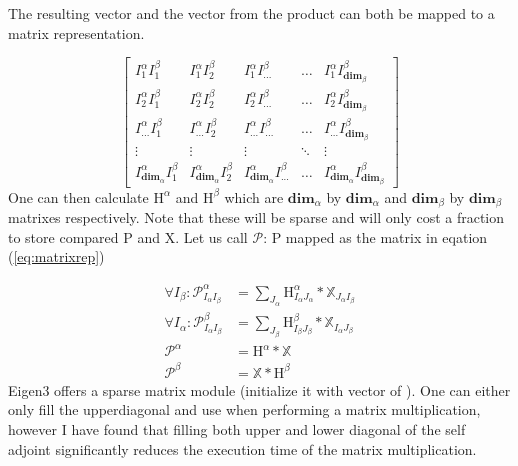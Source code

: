 \documentclass[12p]{article}
\begin{document}
The resulting vector and the vector from the product can both be mapped to a matrix representation.

\begin{equation}
\begin{bmatrix} \label{eq:matrixrep}
    I^{\alpha}_1 I^{\beta}_1 & I^{\alpha}_1 I^{\beta}_2  & I^{\alpha}_1 I^{\beta}_{...} & \dots  & I^{\alpha}_1 I^{\beta}_{\textbf{dim}_\beta} \\
    I^{\alpha}_2 I^{\beta}_1 & I^{\alpha}_2 I^{\beta}_2  & I^{\alpha}_2 I^{\beta}_{...} & \dots  & I^{\alpha}_2 I^{\beta}_{\textbf{dim}_\beta} \\
    I^{\alpha}_{...} I^{\beta}_1 & I^{\alpha}_{...} I^{\beta}_2  & I^{\alpha}_{...} I^{\beta}_{...} & \dots  & I^{\alpha}_{...} I^{\beta}_{\textbf{dim}_\beta} \\
    \vdots & \vdots & \vdots & \ddots & \vdots \\
    I^{\alpha}_{\textbf{dim}_\alpha} I^{\beta}_1 & I^{\alpha}_{\textbf{dim}_\alpha} I^{\beta}_2  & I^{\alpha}_{\textbf{dim}_\alpha} I^{\beta}_{...} & \dots  &
    I^{\alpha}_{\textbf{dim}_\alpha} I^{\beta}_{\textbf{dim}_\beta}
\end{bmatrix}
\end{equation}
One can then calculate $\text{H}^{\alpha}$ and $\text{H}^{\beta}$ which are $\textbf{dim}_\alpha$ by $\textbf{dim}_\alpha$ and $\textbf{dim}_\beta$ by $\textbf{dim}_\beta$
matrixes respectively. Note that these will be sparse and will only cost a fraction to store compared P and X.
Let us call $\mathcal{P}$: P mapped as the matrix in eqation (\ref{eq:matrixrep})

\begin{align}
    \forall I_\beta: \mathcal{P}^{\alpha}_{I_\alpha I_\beta} & = \sum_{J_\alpha} \text{H}^{\alpha}_{I_\alpha J_\alpha} * \mathbb{X}_{J_\alpha I_\beta} \\
    \forall I_\alpha: \mathcal{P}^{\beta}_{I_\alpha  I_\beta} & = \sum_{J_\beta} \text{H}^{\beta}_{I_\beta J_\beta} * \mathbb{X}_{I_\alpha J_\beta} \\
   \mathcal{P}^\alpha & = \text{H}^{\alpha} * \mathbb{X} \\
  \mathcal{P}^\beta & = \mathbb{X} * \text{H}^{\beta}
\end{align}
Eigen3 offers a sparse matrix module (initialize it with vector of ). One can either only fill the upperdiagonal and use 
when performing a matrix multiplication, however I have found that filling both upper and lower diagonal of the self adjoint  significantly reduces the execution time of the matrix multiplication.
\end{document}
